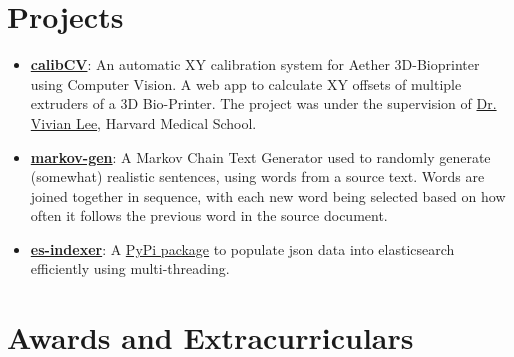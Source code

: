 \documentclass[11pt,a4paper,sans]{moderncv} %
\begin{document}
\setlength{\hintscolumnwidth}{2cm} %


\section{Projects}
\begin{itemize}
    \item \textbf{\href{https://github.com/itsron717/XY-Calibration-3D-Printer}{calibCV}}: An automatic XY calibration system for Aether 3D-Bioprinter using Computer Vision. A web app to calculate XY offsets of multiple extruders of a 3D Bio-Printer. The project was under the supervision of \href{https://connects.catalyst.harvard.edu/Profiles/display/Person/167101}{Dr. Vivian Lee}, Harvard Medical School.
    \item \textbf{\href{https://github.com/itsron717/markov-gen}{markov-gen}}: A Markov Chain Text Generator used to randomly generate (somewhat) realistic sentences, using words from a source text. Words are joined together in sequence, with each new word being selected based on how often it follows the previous word in the source document.
    \item \textbf{\href{https://github.com/itsron717/es-indexer}{es-indexer}}: A \href{https://pypi.org/project/es-indexer/0.1/}{PyPi package} to populate json data into elasticsearch efficiently using multi-threading. 
\end{itemize}







\section{Awards and Extracurriculars}

\end{document}
